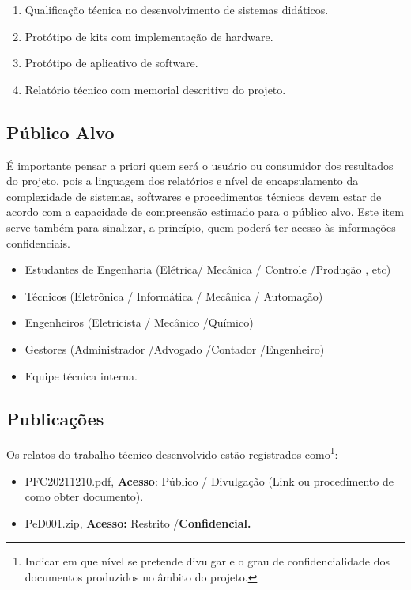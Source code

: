 \begin{enumerate}
	\item Qualificação técnica no desenvolvimento de sistemas didáticos.
	\item Protótipo de kits com implementação de hardware.
	\item Protótipo de aplicativo de software.
	\item Relatório técnico com memorial descritivo do projeto.
\end{enumerate}


\subsection{Público Alvo}

É importante pensar a priori quem será o usuário ou consumidor dos
resultados do projeto, pois a linguagem dos relatórios e nível de
encapsulamento da complexidade de sistemas, softwares e procedimentos
técnicos devem estar de acordo com a capacidade de compreensão estimado
para o público alvo. Este item serve também para sinalizar, a princípio,
quem poderá ter acesso às informações confidenciais.

\begin{itemize}
	\item  Estudantes de Engenharia (Elétrica/ Mecânica / Controle /Produção ,
	etc)
	\item  Técnicos (Eletrônica / Informática / Mecânica / Automação)
	\item  Engenheiros (Eletricista / Mecânico /Químico)
	\item  Gestores (Administrador /Advogado /Contador /Engenheiro)
	\item  Equipe técnica interna.
\end{itemize}

\subsection{Publicações}
Os relatos do trabalho técnico desenvolvido estão registrados como\footnote{Indicar em que nível se pretende divulgar e o grau de confidencialidade
	dos documentos produzidos no âmbito do projeto.}:
\begin{itemize}
	\item  PFC20211210.pdf, \textbf{Acesso}: Público / Divulgação (Link ou procedimento de como obter documento).
	\item  PeD001.zip, \textbf{Acesso:} Restrito /\textbf{Confidencial.}
\end{itemize}

